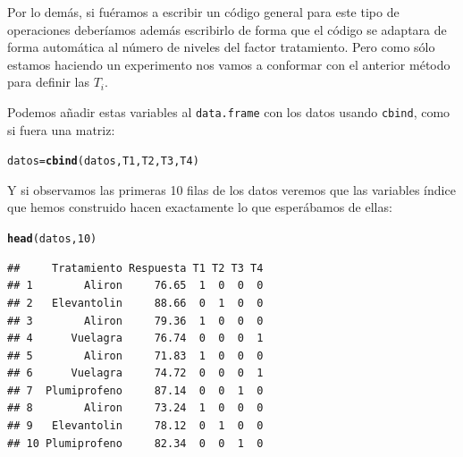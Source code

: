 \documentclass[10pt,a4paper]{article}\usepackage[]{graphicx}\usepackage[]{color}
\makeatletter
\newcommand{\hlnum}[1]{\textcolor[rgb]{0.686,0.059,0.569}{#1}}%
\newcommand{\hlstd}[1]{\textcolor[rgb]{0.345,0.345,0.345}{#1}}%
\newcommand{\hlkwb}[1]{\textcolor[rgb]{0.69,0.353,0.396}{#1}}%
\newcommand{\hlkwd}[1]{\textcolor[rgb]{0.737,0.353,0.396}{\textbf{#1}}}%
\newenvironment{kframe}{%
 \def\at@end@of@kframe{}%
 \ifinner\ifhmode%
  \def\at@end@of@kframe{\end{minipage}}%
  \begin{minipage}{\columnwidth}%
 \fi\fi%
 \def\FrameCommand##1{\hskip\@totalleftmargin \hskip-\fboxsep
 \colorbox{shadecolor}{##1}\hskip-\fboxsep
     \hskip-\linewidth \hskip-\@totalleftmargin \hskip\columnwidth}%
 \MakeFramed {\advance\hsize-\width
   \@totalleftmargin\z@ \linewidth\hsize
   \@setminipage}}%
 {\par\unskip\endMakeFramed%
 \at@end@of@kframe}
\newenvironment{knitrout}{}{} %
\makeatother
\begin{document}
Por lo demás, si fuéramos a escribir un código general para este tipo de operaciones deberíamos además escribirlo de forma que el código se adaptara de forma automática al número de niveles del factor tratamiento. Pero como sólo estamos haciendo un experimento nos vamos a conformar con el anterior método para definir las $T_i$.

Podemos añadir estas variables al {\tt data.frame} con los datos usando {\tt cbind}, como si fuera una matriz:
\begin{knitrout}
\color{fgcolor}\begin{kframe}
\begin{alltt}
\hlstd{datos} \hlkwb{=} \hlkwd{cbind}\hlstd{(datos, T1, T2, T3, T4)}
\end{alltt}
\end{kframe}
\end{knitrout}
Y si observamos las primeras 10 filas de los datos veremos que las variables índice que hemos construido hacen exactamente lo que esperábamos de ellas:
\begin{knitrout}
\color{fgcolor}\begin{kframe}
\begin{alltt}
\hlkwd{head}\hlstd{(datos,} \hlnum{10}\hlstd{)}
\end{alltt}
\begin{verbatim}
##     Tratamiento Respuesta T1 T2 T3 T4
## 1        Aliron     76.65  1  0  0  0
## 2   Elevantolin     88.66  0  1  0  0
## 3        Aliron     79.36  1  0  0  0
## 4      Vuelagra     76.74  0  0  0  1
## 5        Aliron     71.83  1  0  0  0
## 6      Vuelagra     74.72  0  0  0  1
## 7  Plumiprofeno     87.14  0  0  1  0
## 8        Aliron     73.24  1  0  0  0
## 9   Elevantolin     78.12  0  1  0  0
## 10 Plumiprofeno     82.34  0  0  1  0
\end{verbatim}
\end{kframe}
\end{knitrout}
\end{document}
